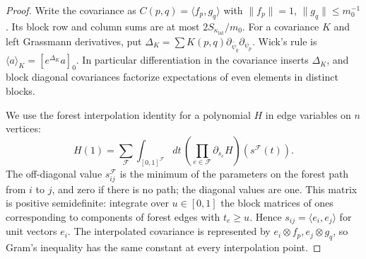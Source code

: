\documentclass[11pt,letterpaper,reqno]{amsart}
\theoremstyle{definition}
\theoremstyle{remark}
\begin{document}
\begin{proof}
Write the covariance as $C(p,q)=\langle f_p,g_q\rangle$ with
$\|f_p\|=1$, $\|g_q\|\le m_0^{-1}$. Its block row and
column sums are at most $2S_{\kappa_{\mathrm{lat}}}/m_0$.
For a covariance $K$ and left Grassmann derivatives, put
$\Delta_K=\sum K(p,q)\partial_{\bar\psi_q}\partial_{\psi_p}$.
Wick's rule is $\langle a\rangle_K=[e^{\Delta_K}a]_0$.
In particular differentiation in the covariance inserts
$\Delta_{\dot K}$, and block diagonal covariances factorize
expectations of even elements in distinct blocks.

We use the forest interpolation identity
\cite[Theorem~III.1]{AbdesselamRivasseau1994} for a polynomial $H$ in
edge variables on $n$ vertices:
\begin{equation}\label{C-386-51}
 H(1)=\sum_{\mathcal F}\int_{[0,1]^{\mathcal F}}dt\,
       \left(\prod_{e\in\mathcal F}\partial_{s_e}H\right)
                                      (s^{\mathcal F}(t)).
\end{equation}
The off-diagonal value $s^{\mathcal F}_{ij}$ is the minimum of
the parameters on the forest path from $i$ to $j$, and zero if
there is no path; the diagonal values are one. This matrix is
positive semidefinite: integrate over $u\in[0,1]$ the block
matrices of ones corresponding to components of forest edges
with $t_e\ge u$. Hence $s_{ij}=\langle e_i,e_j\rangle$ for
unit vectors $e_i$. The interpolated covariance is represented
by $e_i\otimes f_p,e_j\otimes g_q$, so Gram's inequality
has the same constant at every interpolation point.


\end{proof}
\end{document}
